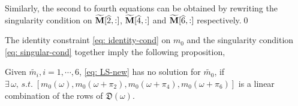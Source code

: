 Similarly, the second to fourth equations can be obtained by rewriting the singularity condition on $\widetilde{\mathbf{M}}[\widehat{2},:]$, $\widetilde{\mathbf{M}}[\widehat{4},:]$ and $\widetilde{\mathbf{M}}[\widehat{6},:]$ respectively.\qed

The identity constraint \eqref{eq: identity-cond} on $m_0$ and the singularity condition \eqref{eq: singular-cond} together imply the following proposition,
\begin{proposition}\label{prop: feasibility}
Given $\widetilde{m_i}, i = 1,\cdots,6$, \eqref{eq: LS-new} has no solution for $\widetilde{m_0}$, if $\exists\,\omega, \,s.t. \; [m_0(\omega), m_0(\omega+\pi_2),m_0(\omega+\pi_4),m_0(\omega+\pi_6)]$ is a linear combination of the rows of $\mathfrak{D}(\omega)$.%
\end{proposition}

